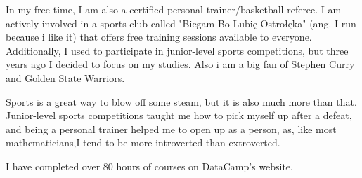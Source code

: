 \documentclass[10pt,a4paper,ragged2e,withhyper]{altacv}
\begin{document}
\begin{paracol}{2}
 In my free time, I am also a certified personal trainer/basketball referee. I am actively involved in a sports club called "Biegam Bo Lubię Ostrołęka" (ang. I run because i like it) that offers free training sessions available to everyone. Additionally, I used to participate in junior-level sports competitions, but three years ago I decided to focus on my studies. Also i am a big fan of Stephen Curry and Golden State Warriors. 

 Sports is a great way to blow off some steam, but it is also much more than that. Junior-level sports competitions taught me how to pick myself up after a defeat, and being a personal trainer helped me to open up as a person, as, like most mathematicians,I tend to be more introverted than extroverted.
 
      I have completed over 80 hours of courses on DataCamp's website.
    \end{paracol}
\end{document}
